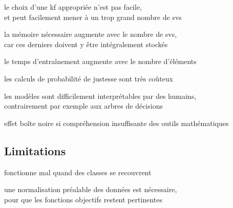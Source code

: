 \begin{itmz}
\item{le choix d’une \gls{kf} appropriée n’est pas facile,\\
et peut facilement mener à un trop grand nombre de \glspl{sv}}
\item{la mémoire nécessaire augmente avec le nombre de \glspl{sv},\\
car ces derniers doivent y être intégralement stockés}
\item{le temps d’entraînement augmente avec le nombre d’éléments}
\item{les calculs de probabilité de justesse sont très coûteux}
\item{les modèles sont difficilement interprétables par des humains,\\
contrairement par exemple aux arbres de décisions}
\item{effet boîte noire si compréhension insuffisante des outils mathématiques}
\end{itmz}

\subsection{Limitations}

\begin{itmz}
\item{fonctionne mal quand des classes se recouvrent}
\item{une normalisation préalable des données est nécessaire,\\
pour que les fonctions objectifs restent pertinentes}
\end{itmz}

\pagebreak

